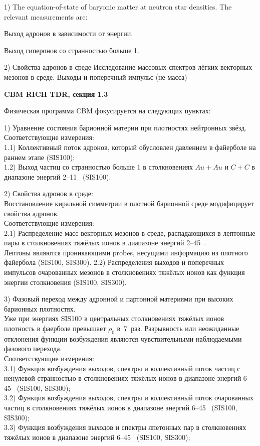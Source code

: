 1) The equation-of-state of baryonic matter at neutron star densities.
The relevant measurements are:

Выход адронов в зависимости от энергии.

Выход гиперонов со странностью больше 1.

2) Свойства адронов в среде
Исследование массовых спектров лёгких векторных мезонов в среде.
Выходы и поперечный импульс (не масса) 


\textbf{CBM RICH TDR, секция 1.3}

Физическая программа CBM фокусируется на следующих пунктах:

1) Уравнение состояния барионной материи при плотностях нейтронных звёзд. \\
Соответствующие измерения: \\
1.1) Коллективный поток адронов, который обусловлен давлением в файерболе на раннем этапе (SIS100); \\
1.2) Выход частиц со странностью больше 1 в столкновениях $Au+Au$ и $C+C$ в диапазоне энергий 2--11~\GeVperNucl{} (SIS100).

2) Свойства адронов в среде: \\
Восстановление киральной симметрии в плотной барионной среде модифицирует свойства адронов. \\
Соответствующие измерения: \\
2.1) Распределение масс векторных мезонов в среде, распадающихся в лептонные пары в столкновениях тяжёлых ионов в диапазоне энергий 2--45~\GeVperNucl{}. \\
Лептоны являются проникающими \todo probes, несущими информацию из плотного файербола (SIS100, SIS300).
2.2) Распределения выходов и поперечных импульсов очарованных мезонов в столкновениях тяжёлых ионов как функция энергии столкновения (SIS100, SIS300).

3) Фазовый переход между адронной и партонной материями при высоких барионных плотностях. \\
Уже при энергиях SIS100 в центральных столкновениях тяжёлых ионов плотность в фаерболе превышает $\rho_{0}$ в~7~раз. Разрывность или неожиданные отклонения функции возбуждения являются чувствительными наблюдаемыми фазового перехода. \\
Соответствующие измерения: \\
3.1) Функция возбуждения выходов, спектры и коллективный поток частиц с ненулевой странностью в столкновениях тяжёлых ионов в диапазоне энергий 6--45~\GeVperNucl{} (SIS100, SIS300); \\
3.2) Функция возбуждения выходов, спектры и коллективный поток очарованных частиц в столкновениях тяжёлых ионов в диапазоне энергий 6--45~\GeVperNucl{} (SIS100, SIS300); \\
3.3) Функция возбуждения выходов и спектры лпетонных пар в столкновениях тяжёлых ионов в диапазоне энергий 6--45~\GeVperNucl{} (SIS100, SIS300);

